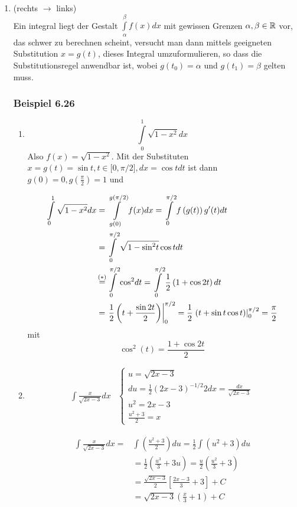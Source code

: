 \begin{enumerate}
\begin{enumerate}
\end{enumerate}
\item (rechts $\to$ links)\\
Ein integral liegt der Gestalt $\int\limits_\alpha ^\beta  {f(x)dx}$ mit gewissen Grenzen $\alpha,\beta\in\mathbb{R}$ vor, das schwer zu berechnen scheint, versucht man dann mittels geeigneten Substitution $x=g(t)$, dieses Integral umzuformulieren, so dass die Substitutionsregel anwendbar ist, wobei $g(t_0)=\alpha$ und $g(t_1)=\beta$ gelten muss. 
\subsubsection*{Beispiel 6.26}
\begin{enumerate}
\item \[\int\limits_0^1 {\sqrt {1 - {x^2}} dx} \] Also $f(x)=\sqrt{1-x^2}$. Mit der Substituten $x=g(t)=\sin t, t\in \lbrack 0,\pi/2\rbrack, dx=\cos tdt$ ist dann $g(0)=0, g\left(\frac{\pi}{2}\right)=1$ und 

\begin{align*}
\int\limits_0^1 {\sqrt {1 - {x^2}} } dx &=\int\limits_{g(0)}^{g(\pi /2)} {f(x)dx = \int\limits_0^{\pi /2} {f\left( {g(t)} \right)g'(t)dt} } \\
 &=\int\limits_0^{\pi /2} {\sqrt {1 - {{\sin }^2}t}} \cos tdt\mathop {\rm{  }}\\ 
&\mathop= \limits^{( * )} \int\limits_0^{\pi /2} {{{\cos }^2}dt}  = \int\limits_0^{\pi /2} {\frac{1}{2}\left( {1 + \cos 2t} \right)dt} \\
&=\left. {\frac{1}{2}\left( {t + \frac{{\sin 2t}}{2}} \right)} \right|_0^{\pi /2} = \frac{1}{2}\left. {\left( {t + \sin t\cos t} \right)} \right|_0^{\pi /2} = \frac{\pi }{2}
\end{align*}
mit
\[
{\cos ^2}(t) = \frac{{1 + \cos 2t}}{2} \tag{\textasteriskcentered}
\]

\item \[\begin{array}{*{20}{c}}
{\int {\frac{x}{{\sqrt {2x - 3} }}dx} }&{\left\{ {\begin{array}{*{20}{l}}
{u = \sqrt {2x - 3} }\\
{du = \frac{1}{2}{{\left( {2x - 3} \right)}^{ - 1/2}}2dx = \frac{{dx}}{{\sqrt {2x - 3} }}}\\
{{u^2} = 2x - 3}\\
{\frac{{{u^2} + 3}}{2} = x}
\end{array}} \right.}
\end{array}\]

\begin{align*}
\int {\frac{x}{{\sqrt {2x - 3} }}dx}  =&\int {\left( {\frac{{{u^2} + 3}}{2}} \right)} du = \frac{1}{2}\int {({u^2} + 3)du} \\
&= \frac{1}{2}\left( {\frac{{{u^3}}}{3} + 3u} \right) = \frac{u}{2}\left( {\frac{{{u^2}}}{3} + 3} \right)\\ 
&= \frac{{\sqrt {2x - 3} }}{2}\left[ {\frac{{2x - 3}}{3} + 3} \right] + C\\
&= \sqrt {2x - 3} \left( {\frac{x}{3} + 1} \right) + C
\end{align*}
\end{enumerate}

\end{enumerate}
